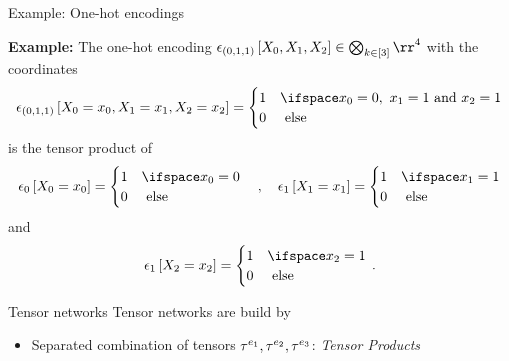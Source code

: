 \documentclass{beamer}
\begin{document}
    \begin{frame}{Example: One-hot encodings}

        \textbf{Example:} The one-hot encoding $\onehotmapofat{(0,1,1)}{\catvariableof{0},\catvariableof{1},\catvariableof{2}} \in  \bigotimes_{\atomenumerator\in[3]}\rr^4$
        with the coordinates
        \begin{align*}
            \onehotmapofat{(0,1,1)}{\indexedcatvariableof{0},\indexedcatvariableof{1},\indexedcatvariableof{2}}
            = \begin{cases}
                  1 & \ifspace\catindexof{0} = 0, \,\, \catindexof{1} = 1 \text{  and  } \catindexof{2} = 1 \\
                  0 & \text{ else}
            \end{cases}
        \end{align*}
        is the tensor product of
        \begin{align*}
            \onehotmapofat{0}{\indexedcatvariableof{0}}
            = \begin{cases}
                  1 & \ifspace\catindexof{0} = 0 \\
                  0 & \text{ else}
            \end{cases}
            \quad  , \quad
            \onehotmapofat{1}{\indexedcatvariableof{1}}
            = \begin{cases}
                  1 & \ifspace\catindexof{1} = 1 \\
                  0 & \text{ else}
            \end{cases}
        \end{align*}
        and
        \begin{align*}
            \onehotmapofat{1}{\indexedcatvariableof{2}}
            = \begin{cases}
                  1 & \ifspace\catindexof{2} = 1 \\
                  0 & \text{ else}
            \end{cases} \, .
        \end{align*}
    \end{frame}

    \begin{frame}{Tensor networks}
        Tensor networks are build by
        \begin{itemize}
            \item Separated combination of tensors $\tau^{e_1},\tau^{e_2}, \tau^{e_3}$: \emph{Tensor Products}
        \end{itemize}
        \vfill
        \begin{center}
            
        \end{center}
    \end{frame}
\end{document}

